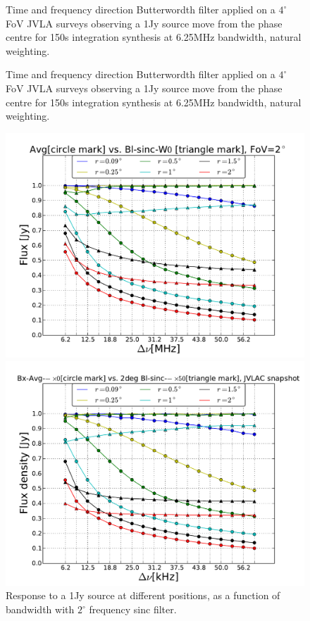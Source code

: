 \documentclass[useAMS,usenatbib]{mn2e}
\begin{document}
\begin{figure}
\begin{minipage}{0.38\linewidth}
   \caption{Time and frequency 
   direction Butterwordth filter applied on a $4^{\circ}$ FoV JVLA surveys observing a 1Jy source move from the phase centre for 150s 
  integration synthesis at 6.25MHz bandwidth, natural weighting.}
  \label{fig:Bl-butter-FoV4}\end{minipage}
  \caption{Time and frequency 
  direction Butterwordth filter applied on a $4^{\circ}$ FoV JVLA surveys observing a 1Jy source move from the phase centre for 150s 
  integration synthesis at 6.25MHz bandwidth, natural weighting.}
  \end{figure} 
  \begin{figure}
    \centering
  \begin{minipage}{0.38\linewidth}\includegraphics[width=1\textwidth]{./Figures/max-integ-freq-sinc-w1x1-fov2.pdf}
    \caption{Response to a 1Jy source at different positions, as a function of  bandwidth with $2^{\circ}$ frequency sinc filter.}
    \label{fig:max-integ-freq-sinc-w1x1-fov2}
  \end{minipage}
  \hspace{1cm}
  \begin{minipage}{0.38\linewidth}\includegraphics[width=1\textwidth]{./Figures/max-integ-freq-sinc-w1x50-fov2.pdf}

\end{minipage}
\end{figure}
\end{document}
